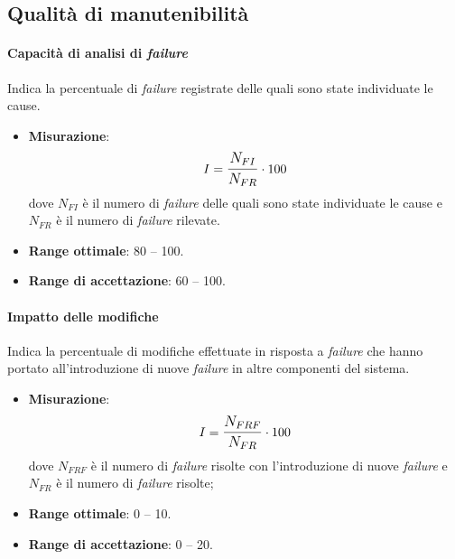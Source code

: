 \subsection{Qualità di manutenibilità}

\paragraph{Capacità di analisi di \textit{failure}}
Indica la percentuale di \textit{failure} registrate delle quali sono state individuate le cause.
\begin{itemize}
	\item \textbf{Misurazione}: 
		$$I=\mathlarger{\frac{N_{FI}}{N_{FR}}} \cdot 100$$
	dove $N_{FI}$ è il numero di \textit{failure} delle quali sono state individuate le cause e $N_{FR}$ è il numero di \textit{failure} rilevate.
	\item \textbf{Range ottimale}: 80 -- 100.
	\item \textbf{Range di accettazione}: 60 -- 100.
\end{itemize}

\paragraph{Impatto delle modifiche}
Indica la percentuale di modifiche effettuate in risposta a \textit{failure} che hanno portato all'introduzione di nuove \textit{failure} in altre componenti del sistema.
\begin{itemize}
	\item \textbf{Misurazione}: 
		$$I=\mathlarger{\frac{N_{FRF}}{N_{FR}}} \cdot 100$$
	dove $N_{FRF}$ è il numero di \textit{failure} risolte con l'introduzione di nuove \textit{failure} e $N_{FR}$ è il numero di \textit{failure} risolte;
	\item \textbf{Range ottimale}: 0 -- 10.
	\item \textbf{Range di accettazione}: 0 -- 20.
\end{itemize}



